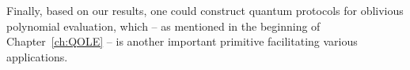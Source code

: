 Finally, based on our results, one could construct quantum protocols for oblivious polynomial evaluation, which -- as mentioned in the beginning of Chapter~\ref{ch:QOLE} -- is another important primitive facilitating various applications.






%
%
%

